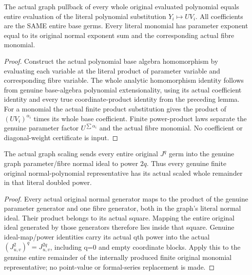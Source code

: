 \begin{lemma}
\label{hir:relative-normal-graph-jets-polynomial-substitution}
\leanok
{}
The actual graph pullback of every whole original evaluated polynomial equals entire evaluation of the literal polynomial substitution $Y_i\mapsto U V_i$. All coefficients are the SAME entire base germs. Every literal monomial has parameter exponent equal to its original normal exponent sum and the corresponding actual fibre monomial.
\end{lemma}
\begin{proof}
Construct the actual polynomial base algebra homomorphism by evaluating each variable at the literal product of parameter variable and corresponding fibre variable. The whole analytic homomorphism identity follows from genuine base-algebra polynomial extensionality, using its actual coefficient identity and every true coordinate-product identity from the preceding lemma. For a monomial the actual finite product substitution gives the product of $(UV_i)^{\alpha_i}$ times its whole base coefficient. Finite power-product laws separate the genuine parameter factor $U^{\sum\alpha_i}$ and the actual fibre monomial. No coefficient or diagonal-weight certificate is input.
\end{proof}

\begin{lemma}
\label{hir:relative-normal-graph-jets-true-power-remainder}
\leanok
{}
The actual graph scaling sends every entire original $J^q$ germ into the genuine graph parameter/fibre normal ideal to power $2q$. Thus every genuine finite original normal-polynomial representative has its actual scaled whole remainder in that literal doubled power.
\end{lemma}
\begin{proof}
Every actual original normal generator maps to the product of the genuine parameter generator and one fibre generator, both in the graph's literal normal ideal. Their product belongs to its actual square. Mapping the entire original ideal generated by those generators therefore lies inside that square. Genuine ideal-map/power identities carry its actual qth power into the actual $(J_{u,v}^2)^q=J_{u,v}^{2q}$, including q=0 and empty coordinate blocks. Apply this to the genuine entire remainder of the internally produced finite original monomial representative; no point-value or formal-series replacement is made.
\end{proof}

